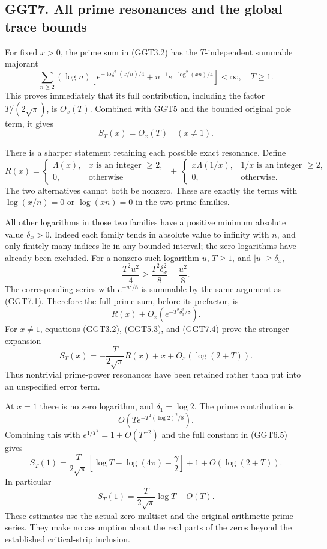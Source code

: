 \subsection{GGT7. All prime resonances and the global trace
bounds}\label{ggt7.-all-prime-resonances-and-the-global-trace-bounds}

For fixed \(x>0\), the prime sum in (GGT3.2) has the \(T\)-independent
summable majorant \[
\sum_{n\ge2}(\log n)
\left[e^{-\log^2(x/n)/4}
+n^{-1}e^{-\log^2(xn)/4}\right]<\infty,
\quad T\ge1.
\tag{GGT7.1}
\] This proves immediately that its full contribution, including the
factor \(T/(2\sqrt\pi)\), is \(O_x(T)\). Combined with GGT5 and the
bounded original pole term, it gives \[
\boxed{S_T(x)=O_x(T)\quad(x\ne1).}
\tag{GGT7.2}
\]

There is a sharper statement retaining each possible exact resonance.
Define \[
R(x)=
\begin{cases}\Lambda(x),&x\text{ is an integer }\ge2,\\0,&\text{otherwise}\end{cases}
\ +\
\begin{cases}x\Lambda(1/x),&1/x\text{ is an integer }\ge2,\\0,&\text{otherwise}.\end{cases}
\tag{GGT7.3}
\] The two alternatives cannot both be nonzero. These are exactly the
terms with \(\log(x/n)=0\) or \(\log(xn)=0\) in the two prime families.

All other logarithms in those two families have a positive minimum
absolute value \(\delta_x>0\). Indeed each family tends in absolute
value to infinity with \(n\), and only finitely many indices lie in any
bounded interval; the zero logarithms have already been excluded. For a
nonzero such logarithm \(u\), \(T\ge1\), and \(|u|\ge\delta_x\), \[
\frac{T^2u^2}{4}
\ge\frac{T^2\delta_x^2}{8}+\frac{u^2}{8}.
\] The corresponding series with \(e^{-u^2/8}\) is summable by the same
argument as (GGT7.1). Therefore the full prime sum, before its
prefactor, is \[
R(x)+O_x(e^{-T^2\delta_x^2/8}).
\tag{GGT7.4}
\] For \(x\ne1\), equations (GGT3.2), (GGT5.3), and (GGT7.4) prove the
stronger expansion \[
\boxed{
S_T(x)=-\frac{T}{2\sqrt\pi}R(x)+x
+O_x(\log(2+T)).
}
\tag{GGT7.5}
\] Thus nontrivial prime-power resonances have been retained rather than
put into an unspecified error term.

At \(x=1\) there is no zero logarithm, and \(\delta_1=\log2\). The prime
contribution is \[
O\!\left(T e^{-T^2(\log2)^2/8}\right).
\tag{GGT7.6}
\] Combining this with \(e^{1/T^2}=1+O(T^{-2})\) and the full constant
in (GGT6.5) gives \[
\boxed{
S_T(1)=
\frac{T}{2\sqrt\pi}
\left[\log T-\log(4\pi)-\frac\gamma2\right]
+1+O(\log(2+T)).
}
\tag{GGT7.7}
\] In particular \[
S_T(1)=\frac{T}{2\sqrt\pi}\log T+O(T).
\tag{GGT7.8}
\] These estimates use the actual zero multiset and the original
arithmetic prime series. They make no assumption about the real parts of
the zeros beyond the established critical-strip inclusion.

